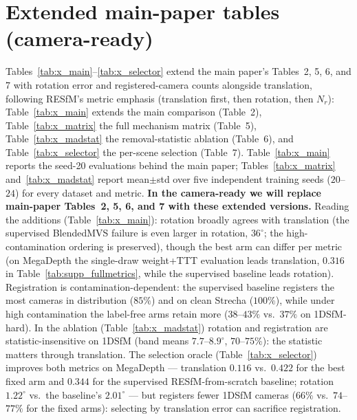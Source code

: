 \documentclass[10pt,twocolumn,letterpaper]{article}
\renewcommand{\deg}{^{\circ}}
\begin{document}
\section{Extended main-paper tables (camera-ready)}\label{sec:extended}
Tables~\ref{tab:x_main}--\ref{tab:x_selector} extend the main paper's Tables~2, 5, 6, and
7 with rotation error and registered-camera counts alongside translation, following
RESfM's metric emphasis (translation first, then rotation, then $N_r$):
Table~\ref{tab:x_main} extends the main comparison (Table~2),
Table~\ref{tab:x_matrix} the full mechanism matrix (Table~5),
Table~\ref{tab:x_madstat} the removal-statistic ablation (Table~6), and
Table~\ref{tab:x_selector} the per-scene selection (Table~7).
Table~\ref{tab:x_main} reports the seed-20 evaluations behind the main paper;
Tables~\ref{tab:x_matrix} and~\ref{tab:x_madstat} report mean$\pm$std over five
independent training seeds ($20$--$24$) for every dataset and metric. \textbf{In the camera-ready we will replace main-paper Tables~2, 5, 6, and 7 with
these extended versions.} Reading the additions (Table~\ref{tab:x_main}): rotation broadly agrees with translation
(the supervised BlendedMVS failure is even larger in rotation, $36\deg$; the
high-contamination ordering is preserved), though the best arm can differ per metric (on MegaDepth the single-draw weight+TTT
evaluation leads translation, $0.316$ in Table~\ref{tab:supp_fullmetrics}, while the
supervised baseline leads rotation).
Registration is contamination-dependent: the supervised baseline registers the most
cameras in distribution ($85\%$) and on clean Strecha ($100\%$), while under high
contamination the label-free arms retain more ($38$--$43\%$ vs.\ $37\%$ on 1DSfM-hard).
In the ablation (Table~\ref{tab:x_madstat}) rotation and registration are
statistic-insensitive on 1DSfM (band means $7.7$--$8.9\deg$, $70$--$75\%$): the statistic
matters through translation. The selection oracle (Table~\ref{tab:x_selector}) improves both metrics on MegaDepth
--- translation $0.116$ vs.\ $0.422$ for the best fixed arm and $0.344$ for the
supervised RESfM-from-scratch baseline; rotation $1.22\deg$ vs.\ the baseline's
$2.01\deg$ --- but registers fewer 1DSfM cameras ($66\%$ vs.\ $74$--$77\%$ for the
fixed arms): selecting by translation error can sacrifice registration.
\end{document}
